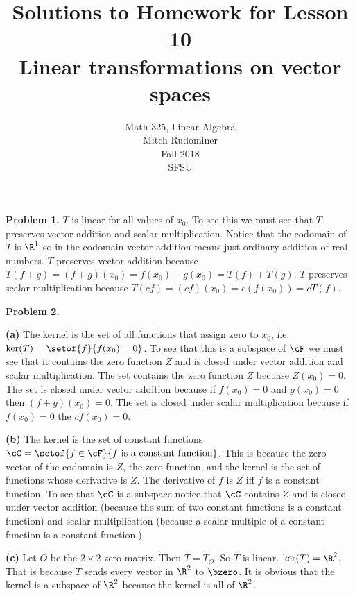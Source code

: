 \documentclass[oneside,12pt]{amsart}
\begin{document}
\title{Solutions to Homework for Lesson 10 \\ Linear transformations on vector spaces}
\author{Math 325, Linear Algebra \\ Mitch Rudominer \\ Fall 2018 \\ SFSU }
\date{}

\maketitle


\textbf{Problem 1.} $T$ is linear for all values of $x_0$. To see this we
must see that $T$ preserves vector addition and scalar multiplication.
Notice that the codomain of $T$ is $\R^1$ so in the codomain vector addition
means just ordinary addition of real numbers. $T$ preserves vector addition
because $T(f + g) = (f+g)(x_0) = f(x_0) + g(x_0) = T(f) + T(g)$.
$T$ preserves scalar multiplication because $T(cf) = (cf)(x_0)
= c(f(x_0)) = cT(f)$.

\bigskip

\textbf{Problem 2.}

\textbf{(a)} The kernel is the set of all functions that assign zero to $x_0$,
i.e. $\ker(T) = \setof{f}{f(x_0) = 0}$. To see that this is a subspace of $\cF$
we must see that it contains the zero function $Z$ and is closed under vector addition
and scalar multiplication. The set contains the zero function $Z$ becuase
$Z(x_0) = 0$. The set is closed under vector addition because if $f(x_0) = 0$
and $g(x_0) = 0$ then $(f+g)(x_0) = 0$. The set is closed under scalar
multiplication because if $f(x_0) = 0$ the $cf(x_0) = 0$.

\bigskip

\textbf{(b)} The kernel is the set of constant functions
$\cC = \setof{f\in\cF}{f \text{ is a constant function} }$. This is because
the zero vector of the codomain is $Z$, the zero function, and the kernel
is the set of functions whose derivative is $Z$. The derivative of $f$ is
$Z$ iff $f$ is a constant function. To see that $\cC$ is a subspace notice
that $\cC$ contains $Z$ and is closed under vector addition (because the sum of
two constant functions is a constant function) and scalar multiplication
(because a scalar multiple of a constant function is a constant function.)

\bigskip

\textbf{(c)} Let $O$ be the $2\times 2$ zero matrix. Then $T=T_O$. So $T$
is linear. $\ker(T) = \R^2$. That is because $T$ sends every vector in
$\R^2$ to $\bzero$. It is obvious that the kernel is a subspace of $\R^2$ because
the kernel is all of $\R^2$.
\end{document}

